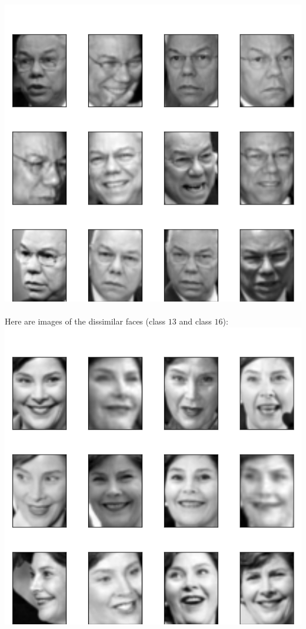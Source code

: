 \documentclass[11pt]{article}
\begin{document}
\begin{enumerate}[1]
\begin{enumerate}[(a)]
\includegraphics[scale=0.35]{plot2.png} \\  \\
Here are images of the dissimilar faces (class $13$ and class $16$): \\
\includegraphics[scale=0.35]{plot13.png}  \hspace*{5em}

\end{enumerate}
\end{enumerate}
\end{document}
